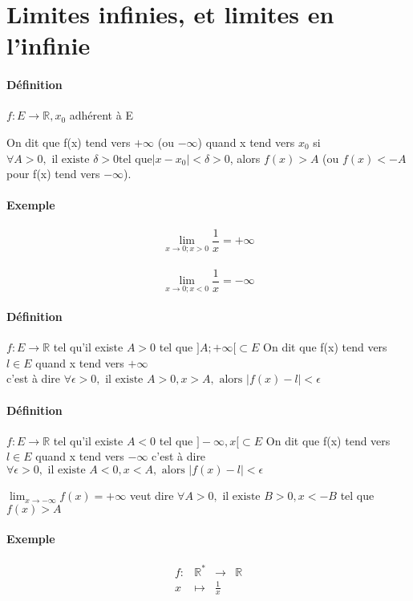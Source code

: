 \section{Limites infinies, et limites en l'infinie}
\paragraph{Définition} $f:E\rightarrow \mathbb{R}, x_0$ adhérent à E

On dit que f(x) tend vers $+\infty$ (ou $-\infty$) quand x tend vers $x_0$ si$\forall A > 0, \text{ il existe } \delta > 0 \text{tel que} |x - x_0| < \delta > 0$, alors $f(x) > A$ (ou $f(x) < -A$ pour f(x) tend vers $-\infty$).

\paragraph{Exemple} \[\lim_{x \to 0; x > 0} \frac{1}{x} = +\infty\]
~\\

\[\lim_{x \to 0; x < 0} \frac{1}{x} = -\infty\]

\paragraph{Définition} $f:E \rightarrow \mathbb{R}$ tel qu'il existe $A >0$ tel que $]A; +\infty[ \subset E$
	On dit que f(x) tend vers $l \in E$ quand x tend vers $+\infty$ 
	~\\
	c'est à dire $\forall \epsilon > 0, \text{ il existe } A >0, x > A, \text{ alors } |f(x) - l| < \epsilon$

\paragraph{Définition} $f:E \rightarrow \mathbb{R}$ tel qu'il existe $A <0$ tel que $]-\infty, x[ \subset E$
	On dit que f(x) tend vers $l \in E$ quand x tend vers $-\infty$ 
	c'est à dire $\forall \epsilon > 0, \text{ il existe } A <0, x < A, \text{ alors } |f(x) - l| < \epsilon$

	$\lim_{x \to -\infty} f(x) = +\infty$ veut dire 
	$\forall A >0, \text{ il existe } B > 0, x < -B$ tel que $f(x) > A$

\paragraph{Exemple}

\begin{align*}
	f:& \mathbb{R}^* &\rightarrow & \mathbb{R} \\
	x&\mapsto& \frac{1}{x}
\end{align*}


